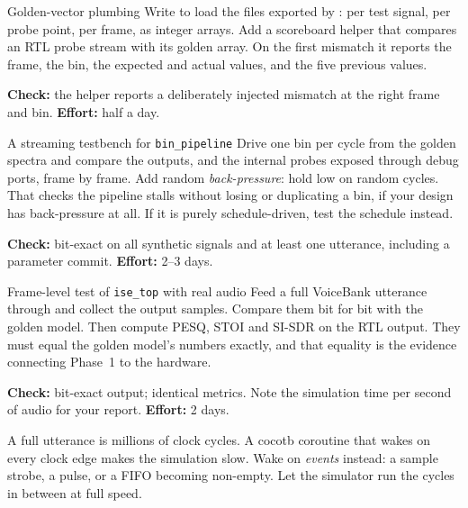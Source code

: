 \begin{stepbox}[label=st:verif:vectors]{Golden-vector plumbing}
Write  to load the files exported by
: per test signal, per probe point, per frame, as
integer arrays. Add a scoreboard helper that compares an RTL probe stream with
its golden array. On the first mismatch it reports the frame, the bin, the
expected and actual values, and the five previous values.

\textbf{Check:} the helper reports a deliberately injected mismatch at the right
frame and bin. \textbf{Effort:} half a day.
\end{stepbox}

\begin{stepbox}[label=st:verif:binpipe]{A streaming testbench for \texttt{bin\_pipeline}}
Drive one bin per cycle from the golden spectra and compare the outputs, and
the internal probes exposed through debug ports, frame by frame. Add random
\emph{back-pressure}: hold  low on random cycles. That checks the
pipeline stalls without losing or duplicating a bin, if your design has
back-pressure at all. If it is purely schedule-driven, test the schedule
instead.

\textbf{Check:} bit-exact on all synthetic signals and at least one utterance,
including a parameter commit. \textbf{Effort:} 2--3 days.
\end{stepbox}

\begin{stepbox}[label=st:verif:top]{Frame-level test of \texttt{ise\_top} with real audio}
Feed a full VoiceBank utterance through  and collect the output
samples. Compare them bit for bit with the golden model. Then compute PESQ, STOI
and SI-SDR on the RTL output. They must equal the golden model's numbers
exactly, and that equality is the evidence connecting Phase~1 to the hardware.

\textbf{Check:} bit-exact output; identical metrics. Note the simulation time
per second of audio for your report. \textbf{Effort:} 2 days.
\end{stepbox}

\begin{tipbox}
A full utterance is millions of clock cycles. A cocotb coroutine that wakes on
every clock edge makes the simulation slow. Wake on \emph{events} instead: a
sample strobe, a  pulse, or a FIFO becoming non-empty. Let the
simulator run the cycles in between at full speed.
\end{tipbox}

